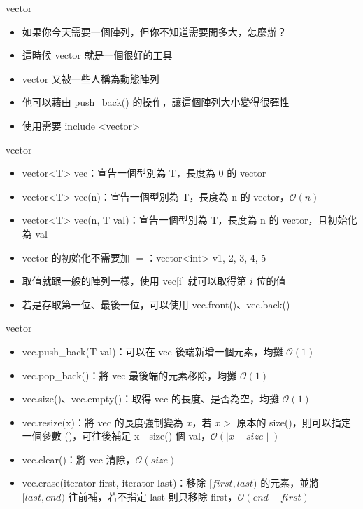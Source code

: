 \documentclass[aspectratio=169]{beamer}
\begin{document}
    \begin{frame}{vector}
        \begin{itemize}
            \item<1-> 如果你今天需要一個陣列，但你不知道需要開多大，怎麼辦？
            \item<2-> 這時候 vector 就是一個很好的工具
            \item<2-> vector 又被一些人稱為動態陣列
            \item<3-> 他可以藉由 push\_back() 的操作，讓這個陣列大小變得很彈性
            \item<4-> 使用需要 include <vector>
        \end{itemize}
    \end{frame}
    
    \begin{frame}{vector}
        \begin{itemize}
            \item<1-> vector<T> vec：宣告一個型別為 T，長度為 0 的 vector
            \item<1-> vector<T> vec(n)：宣告一個型別為 T，長度為 n 的 vector，$\mathcal{O}(n)$
            \item<1-> vector<T> vec(n, T val)：宣告一個型別為 T，長度為 n 的 vector，且初始化為 val
            \item<2-> vector 的初始化不需要加 $=$：vector<int> v{1, 2, 3, 4, 5}
            \item<3-> 取值就跟一般的陣列一樣，使用 vec[i] 就可以取得第 $i$ 位的值
            \item<3-> 若是存取第一位、最後一位，可以使用 vec.front()、vec.back()
        \end{itemize}
    \end{frame}

    \begin{frame}{vector}
        \begin{itemize}
            \item<1-> vec.push\_back(T val)：可以在 vec 後端新增一個元素，均攤 $\mathcal{O}(1)$
            \item<1-> vec.pop\_back()：將 vec 最後端的元素移除，均攤 $\mathcal{O}(1)$
            \item<2-> vec.size()、vec.empty()：取得 vec 的長度、是否為空，均攤 $\mathcal{O}(1)$
            \item<3-> vec.resize(x)：將 vec 的長度強制變為 $x$，若 $x >$ 原本的 size()，則可以指定一個參數 ()，可往後補足 x - size() 個 val，$\mathcal{O}(\mid x - size \mid)$
            \item<4-> vec.clear()：將 vec 清除，$\mathcal{O}(size)$
            \item<5-> vec.erase(iterator first, iterator last)：移除 $[first, last)$ 的元素，並將 $[last, end)$ 往前補，若不指定 last 則只移除 first，$\mathcal{O}(end-first)$
        \end{itemize}
    \end{frame}
\end{document}
